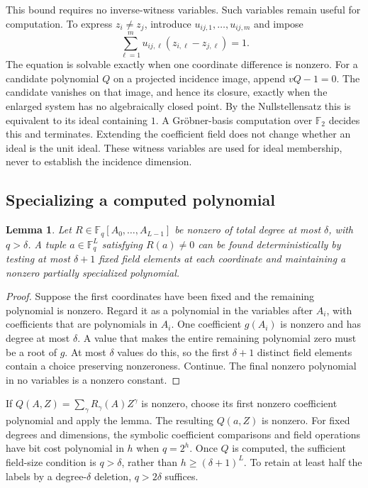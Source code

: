 \documentclass[11pt,a4paper]{article}
\newcommand{\F}{\mathbb F}
\newtheorem{lemma}[theorem]{Lemma}
\theoremstyle{definition}
\theoremstyle{remark}
\numberwithin{equation}{section}
\begin{document}
This bound requires no inverse-witness variables. Such variables remain useful for computation. To express $z_i\ne z_j$, introduce $u_{ij,1},\ldots,u_{ij,m}$ and impose
\begin{equation}\label{eq:inverse-witness}
\sum_{\ell=1}^m u_{ij,\ell}(z_{i,\ell}-z_{j,\ell})=1.
\end{equation}
The equation is solvable exactly when one coordinate difference is nonzero. For a candidate polynomial $Q$ on a projected incidence image, append $vQ-1=0$. The candidate vanishes on that image, and hence its closure, exactly when the enlarged system has no algebraically closed point. By the Nullstellensatz this is equivalent to its ideal containing $1$. A Gr\"obner-basis computation over $\F_2$ decides this and terminates. Extending the coefficient field does not change whether an ideal is the unit ideal. These witness variables are used for ideal membership, never to establish the incidence dimension.

\subsection{Specializing a computed polynomial}\label{sec:adaptive}
\begin{lemma}\label{lem:adaptive}
Let $R\in\F_q[A_0,\ldots,A_{L-1}]$ be nonzero of total degree at most $\delta$, with $q>\delta$. A tuple $a\in\F_q^L$ satisfying $R(a)\ne0$ can be found deterministically by testing at most $\delta+1$ fixed field elements at each coordinate and maintaining a nonzero partially specialized polynomial.
\end{lemma}

\begin{proof}
Suppose the first coordinates have been fixed and the remaining polynomial is nonzero. Regard it as a polynomial in the variables after $A_i$, with coefficients that are polynomials in $A_i$. One coefficient $g(A_i)$ is nonzero and has degree at most $\delta$. A value that makes the entire remaining polynomial zero must be a root of $g$. At most $\delta$ values do this, so the first $\delta+1$ distinct field elements contain a choice preserving nonzeroness. Continue. The final nonzero polynomial in no variables is a nonzero constant.
\end{proof}

If $Q(A,Z)=\sum_\gamma R_\gamma(A)Z^\gamma$ is nonzero, choose its first nonzero coefficient polynomial and apply the lemma. The resulting $Q(a,Z)$ is nonzero. For fixed degrees and dimensions, the symbolic coefficient comparisons and field operations have bit cost polynomial in $h$ when $q=2^h$. Once $Q$ is computed, the sufficient field-size condition is $q>\delta$, rather than $h\ge(\delta+1)^L$. To retain at least half the labels by a degree-$\delta$ deletion, $q>2\delta$ suffices.
\end{document}
